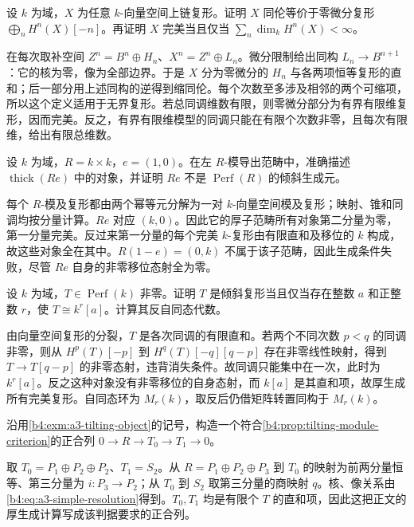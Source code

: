 \begin{optionalexercise}\label{b4:ex:20-field-perfect}
	设 \(k\) 为域，\(X\) 为任意 \(k\)-向量空间上链复形。证明 \(X\) 同伦等价于零微分复形 \(\bigoplus_n H^n(X)[-n]\)。再证明 \(X\) 完美当且仅当 \(\sum_n\dim_kH^n(X)<\infty\)。
\end{optionalexercise}
\begin{solution}
	在每次取补空间 \(Z^n=B^n\oplus H_n\)、\(X^n=Z^n\oplus L_n\)。微分限制给出同构 \(L_n\to B^{n+1}\)：它的核为零，像为全部边界。于是 \(X\) 分为零微分的 \(H_n\) 与各两项恒等复形的直和；后一部分用上述同构的逆得到缩同伦。每个次数至多涉及相邻的两个可缩项，所以这个定义适用于无界复形。若总同调维数有限，则零微分部分为有界有限维复形，因而完美。反之，有界有限维模型的同调只能在有限个次数非零，且每次有限维，给出有限总维数。
\end{solution}

\begin{optionalexercise}\label{b4:ex:20-thick-product-ring}
	设 \(k\) 为域，\(R=k\times k\)，\(e=(1,0)\)。在左 \(R\)-模导出范畴中，准确描述 \(\operatorname{thick}(Re)\) 中的对象，并证明 \(Re\) 不是 \(\operatorname{Perf}(R)\) 的倾斜生成元。
\end{optionalexercise}
\begin{solution}
	每个 \(R\)-模及复形都由两个幂等元分解为一对 \(k\)-向量空间模及复形；映射、锥和同调均按分量计算。\(Re\) 对应 \((k,0)\)。因此它的厚子范畴所有对象第二分量为零，第一分量完美。反过来第一分量的每个完美 \(k\)-复形由有限直和及移位的 \(k\) 构成，故这些对象全在其中。\(R(1-e)=(0,k)\) 不属于该子范畴，因此生成条件失败，尽管 \(Re\) 自身的非零移位态射全为零。
\end{solution}

\begin{optionalexercise}\label{b4:ex:20-tilting-shifts-over-field}
	设 \(k\) 为域，\(T\in\operatorname{Perf}(k)\) 非零。证明 \(T\) 是倾斜复形当且仅当存在整数 \(a\) 和正整数 \(r\)，使 \(T\cong k^r[a]\)。计算其反自同态代数。
\end{optionalexercise}
\begin{solution}
	由向量空间复形的分裂，\(T\) 是各次同调的有限直和。若两个不同次数 \(p<q\) 的同调非零，则从 \(H^p(T)[-p]\) 到 \(H^q(T)[-q][q-p]\) 存在非零线性映射，得到 \(T\to T[q-p]\) 的非零态射，违背消失条件。故同调只能集中在一次，此时为 \(k^r[a]\)。反之这种对象没有非零移位的自身态射，而 \(k[a]\) 是其直和项，故厚生成所有完美复形。自同态环为 \(M_r(k)\)，取反后仍借矩阵转置同构于 \(M_r(k)\)。
\end{solution}

\begin{optionalexercise}\label{b4:ex:20-a3-generation-sequence}
	沿用\cref{b4:exm:a3-tilting-object}的记号，构造一个符合\cref{b4:prop:tilting-module-criterion}的正合列 \(0\to R\to T_0\to T_1\to0\)。
\end{optionalexercise}
\begin{solution}
	取 \(T_0=P_1\oplus P_2\oplus P_2\)、\(T_1=S_2\)。从 \(R=P_1\oplus P_2\oplus P_3\) 到 \(T_0\) 的映射为前两分量恒等、第三分量为 \(i:P_3\to P_2\)；从 \(T_0\) 到 \(S_2\) 取第三分量的商映射 \(q\)。核、像关系由\eqref{b4:eq:a3-simple-resolution}得到。\(T_0,T_1\) 均是有限个 \(T\) 的直和项，因此这把正文的厚生成计算写成该判据要求的正合列。
\end{solution}

